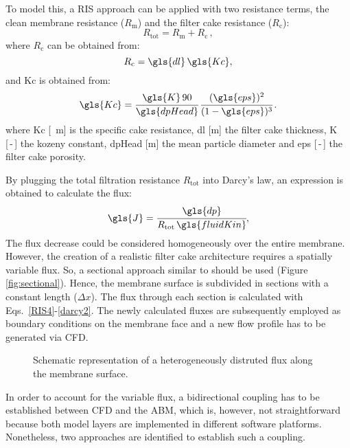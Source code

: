 \par
To model this, a \gls{RIS} approach can be applied with two resistance terms, the clean membrane resistance ($R_\mathrm{m}$) and the filter cake resistance ($R_\mathrm{c}$):
\begin{equation}
 R_\mathrm{tot}= R_\mathrm{m} + R_\mathrm{c} \, ,
 \label{RIS4}
\end{equation}
where $R_\mathrm{c}$ can be obtained from:
\begin{equation}
 R_\mathrm{c}= \gls{dl}\, \gls{Kc},
\end{equation}
and \gls{Kc} is obtained from:
\begin{equation}
 \gls{Kc}= \cfrac{\gls{K}\, 90}{\gls{dpHead}} \, \cfrac{(\gls{eps})^2}{(1-\gls{eps})^3} \, .
\end{equation}
where \gls{Kc} [\unit{\rpsquare\metre}] is the specific cake resistance, \gls{dl} [\unit{\metre}] the filter cake thickness, \gls{K} [\,-\,] the kozeny constant, \gls{dpHead} [\unit{\metre}] the mean particle diameter and \gls{eps} [\,-\,] the filter cake porosity. \par
By plugging the total filtration resistance $R_\mathrm{tot}$ into Darcy's law, an expression is obtained to calculate the flux:
\begin{equation}
\gls{J} =  \cfrac{\gls{dp}}{R_\mathrm{tot}\, \gls{fluidKin}},
 \label{darcy2}
\end{equation}
The flux decrease could be considered homogeneously over the entire membrane. However, the creation of a realistic filter cake architecture requires a spatially variable flux. So, a sectional approach similar to \cite{Li2006} should be used (Figure \ref{fig:sectional}). Hence, the membrane surface is subdivided in sections with a constant length ($\Delta x$). The flux through each section is calculated with Eqs.\ \eqref{RIS4}-\eqref{darcy2}. The newly calculated fluxes are subsequently employed as boundary conditions on the membrane face and a new flow profile has to be generated via \gls{CFD}. \par
\begin{figure}[H]
    \centering
    \def\svgwidth{0.6\columnwidth}
    
    \caption{Schematic representation of a heterogeneously distruted flux along the membrane surface. \label{fig:sectional}}
    \label{sectional}
\end{figure}
In order to account for the variable flux, a bidirectional coupling  has to be established between \gls{CFD} and the \gls{ABM}, which is, however, not straightforward because both model layers are implemented in different software platforms. Nonetheless, two approaches are identified to establish such a coupling. \par

